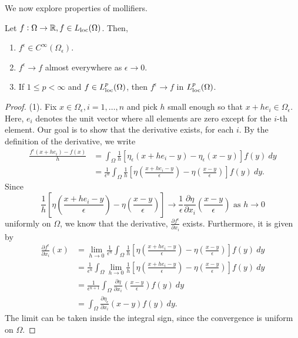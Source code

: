 \documentclass[10pt]{article}
\begin{document}
We now explore properties of mollifiers.  
\begin{theorem}
	Let $f: \Omega \to \mathbb{R}, f \in L_{\operatorname{loc}}(\Omega)$. Then, 
	\begin{enumerate}
		\item $f^{\epsilon} \in C^{\infty}(\Omega_\epsilon)$.
		\item $f^\epsilon \to f$ almost everywhere as $\epsilon \to 0$. 
		\item If $1 \leq p < \infty$ and $f \in L_{\operatorname{loc}}^p(\Omega)$, then $f^\epsilon \to f$ in $L_{\operatorname{loc}}^p(\Omega)$. 
	\end{enumerate}
\end{theorem}
\begin{proof}
	(1). Fix $x \in \Omega_\epsilon, i = 1,\dots,n$ and pick $h$ small enough so that $x + he_i \in \Omega_\epsilon$. Here, $e_i$ denotes the unit vector where all elements are zero except for the $i$-th element. Our goal is to show that the derivative exists, for each $i$. By the definition of the derivative, we write
	\begin{align*}
		\displaystyle \frac{f^{\epsilon}(x + he_i) - f(x)}{h} &= \int_{\Omega}{\frac{1}{h}\left[ \eta_\epsilon(x + he_i -y) - \eta_\epsilon(x-y)\right]f(y) \: dy} \\
		&= \frac{1}{\epsilon^n} \int_{\Omega}{\frac{1}{h}\left[ \eta\left(\frac{x + he_i -y}{\epsilon}\right) - \eta\left(\frac{x-y}{\epsilon}\right)\right]f(y) \: dy}.
	\end{align*}
	Since 
	\begin{equation*}
		\displaystyle \frac{1}{h}\left[ \eta\left(\frac{x + he_i -y}{\epsilon}\right) - \eta\left(\frac{x-y}{\epsilon}\right) \right] \to \frac{1}{\epsilon} \frac{\partial \eta}{\partial x_i}\left(\frac{x-y}{\epsilon} \right) \textrm{ as } h \to 0
	\end{equation*}
	uniformly on $\Omega$, we know that the derivative, $\tfrac{\partial f^\epsilon}{\partial x_i}$ exists. Furthermore, it is given by 
	\begin{align*}
		\displaystyle \frac{\partial f^\epsilon}{\partial x_i}(x) &= \lim\limits_{h \to 0}{\frac{1}{\epsilon^{n}}\int_{\Omega}{\frac{1}{h}\left[ \eta\left(\frac{x + he_i -y}{\epsilon}\right) - \eta\left(\frac{x-y}{\epsilon}\right)\right]f(y) \: dy}} \\
		&= \frac{1}{\epsilon^n}\int_{\Omega}{\lim\limits_{h \to 0}{\frac{1}{h}\left[ \eta\left(\frac{x + he_i -y}{\epsilon}\right) - \eta\left(\frac{x-y}{\epsilon}\right)\right]}f(y) \: dy} \\
		&= \frac{1}{\epsilon^{n + 1}} \int_{\Omega}{\frac{\partial \eta}{\partial x_i}\left( \frac{x-y}{\epsilon} \right) f(y) \: dy} \\
		&= \int_{\Omega}{\frac{\partial \eta_\epsilon}{\partial x_i}(x-y) f(y) \: dy}.
	\end{align*}
	The limit can be taken inside the integral sign, since the convergence is uniform on $\Omega$. 
	

\end{proof}
\end{document}

